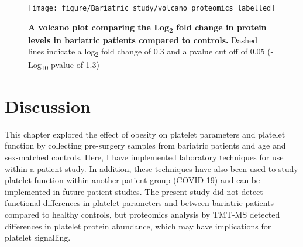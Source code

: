 \documentclass[11pt,twoside]{bristolthesis}
\begin{document}
\begin{figure}

{\centering \texttt{[image: figure/Bariatric\_study/volcano\_proteomics\_labelled]} 

}

\caption[A volcano plot comparing the Log\textsubscript{2} fold change in protein levels in bariatric patients compared to controls]{\textbf{A volcano plot comparing the Log\textsubscript{2} fold change in protein levels in bariatric patients compared to controls.} Dashed lines indicate a log\textsubscript{2} fold change of 0.3 and a pvalue cut off of 0.05 (-Log\textsubscript{10} pvalue of 1.3)}\label{fig:volcano}
\end{figure}
\hypertarget{discussion-1}{%
\section{Discussion}\label{discussion-1}}

This chapter explored the effect of obesity on platelet parameters and platelet function by collecting pre-surgery samples from bariatric patients and age and sex-matched controls. Here, I have implemented laboratory techniques for use within a patient study. In addition, these techniques have also been used to study platelet function within another patient group (COVID-19) and can be implemented in future patient studies. The present study did not detect functional differences in platelet parameters and between bariatric patients compared to healthy controls, but proteomics analysis by TMT-MS detected differences in platelet protein abundance, which may have implications for platelet signalling.
\end{document}

